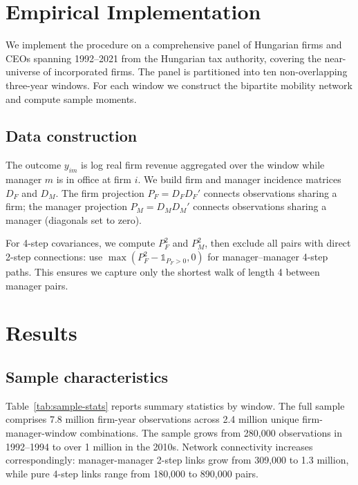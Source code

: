 \documentclass[9pt,twocolumn,twoside]{pnas-new}
\begin{document}
\section*{Empirical Implementation}

We implement the procedure on a comprehensive panel of Hungarian firms and CEOs spanning 1992--2021 from the Hungarian tax authority, covering the near-universe of incorporated firms. The panel is partitioned into ten non-overlapping three-year windows. For each window we construct the bipartite mobility network and compute sample moments.

\subsection*{Data construction}
The outcome $y_{im}$ is log real firm revenue aggregated over the window while manager $m$ is in office at firm $i$. We build firm and manager incidence matrices $D_F$ and $D_M$. The firm projection $P_F = D_F D_F'$ connects observations sharing a firm; the manager projection $P_M = D_M D_M'$ connects observations sharing a manager (diagonals set to zero). 

For 4-step covariances, we compute $P_F^2$ and $P_M^2$, then exclude all pairs with direct 2-step connections: use $\max(P_F^2 - \mathbb{1}_{P_F>0}, 0)$ for manager--manager 4-step paths. This ensures we capture only the shortest walk of length 4 between manager pairs.

\section*{Results}

\subsection*{Sample characteristics}
Table~\ref{tab:sample-stats} reports summary statistics by window. The full sample comprises 7.8 million firm-year observations across 2.4 million unique firm-manager-window combinations. The sample grows from 280,000 observations in 1992--1994 to over 1 million in the 2010s. Network connectivity increases correspondingly: manager-manager 2-step links grow from 309,000 to 1.3 million, while pure 4-step links range from 180,000 to 890,000 pairs.
\end{document}
